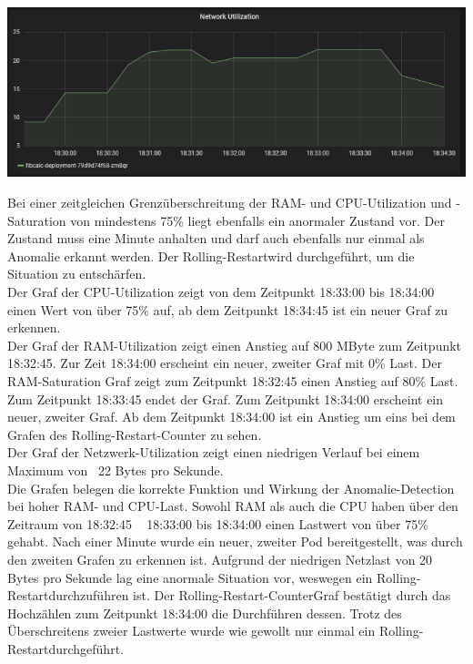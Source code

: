 \documentclass[a4paper,10pt]{scrartcl}
\begin{document}
\begin{description}
\begin{minipage}{\linewidth}
  			
  			\includegraphics[width=1\textwidth]{img/RAMCPUAnomalie/Netzwerk.PNG}
\end{minipage}

Bei einer zeitgleichen Grenzüberschreitung der RAM- und CPU-Utilization und -Saturation von mindestens 75\% liegt ebenfalls ein anormaler Zustand vor. Der Zustand muss eine Minute anhalten und darf auch ebenfalls nur einmal als\\ Anomalie erkannt werden. Der \glqq Rolling-Restart\grqq wird durchgeführt, um die Situation zu entschärfen.\\
Der Graf der CPU-Utilization zeigt von dem Zeitpunkt 18:33:00 bis 18:34:00 einen Wert von über 75\% auf, ab dem Zeitpunkt 18:34:45 ist ein neuer Graf zu erkennen.\\
Der Graf der RAM-Utilization zeigt einen Anstieg auf 800 MByte zum Zeitpunkt 18:32:45. Zur Zeit 18:34:00 erscheint ein neuer, zweiter Graf mit 0\% Last.
Der RAM-Saturation Graf zeigt zum Zeitpunkt 18:32:45 einen Anstieg auf 80\% Last. Zum Zeitpunkt 18:33:45 endet der Graf. Zum Zeitpunkt 18:34:00 erscheint ein neuer, zweiter Graf.
Ab dem Zeitpunkt 18:34:00 ist ein Anstieg um eins bei dem Grafen des \glqq Rolling-Restart\grqq -Counter zu sehen.\\
Der Graf der Netzwerk-Utilization zeigt einen niedrigen Verlauf bei einem Maximum von ~22 Bytes pro Sekunde.\\
Die Grafen belegen die korrekte Funktion und Wirkung der Anomalie-Detection bei hoher RAM- und CPU-Last. Sowohl RAM als auch die CPU haben über den Zeitraum von 18:32:45 ~ 18:33:00 bis 18:34:00 einen Lastwert von über 75\% gehabt. Nach einer Minute wurde ein neuer, zweiter Pod bereitgestellt, was durch den zweiten Grafen zu erkennen ist. Aufgrund der niedrigen Netzlast von 20 Bytes pro Sekunde lag eine anormale Situation vor, weswegen ein \glqq Rolling-Restart\grqq durchzuführen ist. Der \glqq Rolling-Restart-Counter\grqq Graf bestätigt durch das Hochzählen zum Zeitpunkt 18:34:00 die Durchführen dessen. Trotz des Überschreitens zweier Lastwerte wurde wie gewollt nur einmal ein \glqq Rolling-Restart\grqq durchgeführt.

\end{description}
\end{document}
